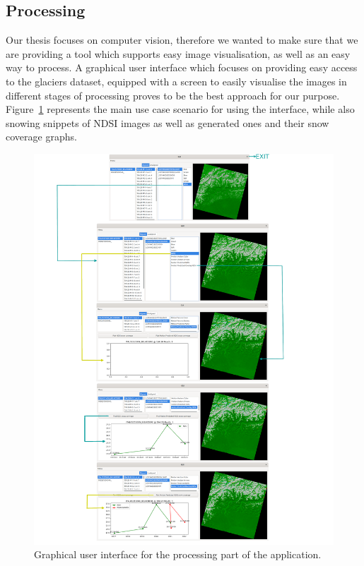 \documentclass[12pt, a4paper]{report}
\begin{document}
	\subsection{Processing}
	\label{sec:processing_gui}
	
	\par Our thesis focuses on computer vision, therefore we wanted to make sure that we are providing a tool which supports easy image visualisation, as well as an easy way to process. A graphical user interface which focuses on providing easy access to the glaciers dataset, equipped with a screen to easily visualise the images in different stages of processing proves to be the best approach for our purpose. Figure~\ref{fig:gui} represents the main use case scenario for using the interface, while also snowing snippets of NDSI images as well as generated ones and their snow coverage graphs.
	
	\begin{figure}[h!]
		\centering
		\includegraphics[width=\columnwidth]{../images/GUI.png}
		\caption{Graphical user interface for the processing part of the application.}
		\label{fig:gui}
	\end{figure}
	
\end{document}
